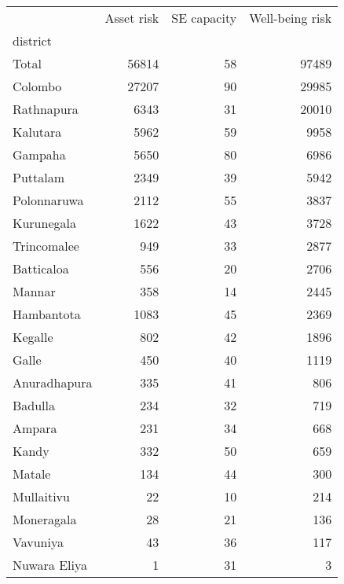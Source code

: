 \begin{tabular}{lrrr}
\toprule
{} &  Asset risk &  SE capacity &  Well-being risk \\
district     &             &              &                  \\
\midrule
Total        &       56814 &           58 &            97489 \\
Colombo      &       27207 &           90 &            29985 \\
Rathnapura   &        6343 &           31 &            20010 \\
Kalutara     &        5962 &           59 &             9958 \\
Gampaha      &        5650 &           80 &             6986 \\
Puttalam     &        2349 &           39 &             5942 \\
Polonnaruwa  &        2112 &           55 &             3837 \\
Kurunegala   &        1622 &           43 &             3728 \\
Trincomalee  &         949 &           33 &             2877 \\
Batticaloa   &         556 &           20 &             2706 \\
Mannar       &         358 &           14 &             2445 \\
Hambantota   &        1083 &           45 &             2369 \\
Kegalle      &         802 &           42 &             1896 \\
Galle        &         450 &           40 &             1119 \\
Anuradhapura &         335 &           41 &              806 \\
Badulla      &         234 &           32 &              719 \\
Ampara       &         231 &           34 &              668 \\
Kandy        &         332 &           50 &              659 \\
Matale       &         134 &           44 &              300 \\
Mullaitivu   &          22 &           10 &              214 \\
Moneragala   &          28 &           21 &              136 \\
Vavuniya     &          43 &           36 &              117 \\
Nuwara Eliya &           1 &           31 &                3 \\
\bottomrule
\end{tabular}
